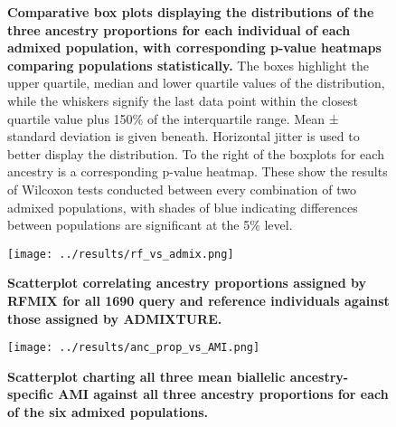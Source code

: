 \documentclass[11pt]{article}
\begin{document}
\begin{figure}[ht!]%
    \centering
     \hspace*{0em}
        \vspace{-0.6cm}
        \caption{\textbf{
            Comparative box plots displaying the distributions of the three ancestry proportions for each individual of each admixed population, with corresponding p-value heatmaps comparing populations statistically.
        }
            The boxes highlight the upper quartile, median and lower quartile values of the distribution, while the whiskers signify the last data point within the closest quartile value plus 150\% of the interquartile range. Mean ± standard deviation is given beneath. Horizontal jitter is used to better display the distribution. To the right of the boxplots for each ancestry is a corresponding p-value heatmap. These show the results of Wilcoxon tests conducted between every combination of two admixed populations, with shades of blue indicating differences between populations are significant at the 5\% level.
        }
\end{figure}




\begin{figure}[htb!]%
    \centering
    \texttt{[image: ../results/rf\_vs\_admix.png]} 
    \vspace{.2cm}
    \caption{\textbf{
        Scatterplot correlating ancestry proportions assigned by RFMIX for all 1690 query and reference individuals against those assigned by ADMIXTURE.
    }
    }
\end{figure}




\begin{figure}[htb!]%
    \centering
    \texttt{[image: ../results/anc\_prop\_vs\_AMI.png]} 
    \vspace{.2cm}
    \caption{\textbf{
        Scatterplot charting all three mean biallelic ancestry-specific AMI against all three ancestry proportions for each of the six admixed populations.
    }
    }
\end{figure}
\end{document}
